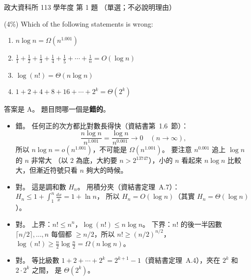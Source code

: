\begin{pastexam}[label={px:nccu-113-dsa-01}]{政大資科所 113 學年度 第 1 題}
（單選；不必說明理由）

(4\%) Which of the following statements is wrong:
\begin{enumerate}[label=\Alph*.]
\item $n\log n=\Omega(n^{1.001})$
\item $\frac{1}{1}+\frac{1}{2}+\frac{1}{3}+\frac{1}{4}+\frac{1}{5}+\cdots+\frac{1}{n}=O(\log n)$
\item $\log(n!)=\Theta(n\log n)$
\item $1+2+4+8+16+\cdots+2^k=\Theta(2^k)$
\end{enumerate}
\end{pastexam}

\begin{pastsoln}
答案是 A。 題目問哪一個是\textbf{錯的}。

\begin{itemize}
\item[A.] 錯。 任何正的次方都比對數長得快（資結書第~1.6~節）：
\[
\frac{n \log n}{n^{1.001}} = \frac{\log n}{n^{0.001}} \to 0 \quad (n \to \infty),
\]
所以 $n \log n = o(n^{1.001})$，不可能是 $\Omega(n^{1.001})$。 要注意 $n^{0.001}$ 追上 $\log n$ 的 $n$ 非常大
（以 $2$ 為底，大約要 $n > 2^{13747}$），小的 $n$ 看起來 $n \log n$ 比較大，但漸近符號只看 $n$ 夠大的時候。
\item[B.] 對。 這是調和數 $H_n$。 用積分夾（資結書定理~A.7）：$H_n \le 1 + \int_1^n \frac{dx}{x} = 1 + \ln n$，
所以 $H_n = O(\log n)$（其實 $H_n = \Theta(\log n)$）。
\item[C.] 對。 上界：$n! \le n^n$，$\log(n!) \le n \log n$。 下界：$n!$ 的後一半因數 $\lceil n/2\rceil, \ldots, n$
每個都 $\ge n/2$，所以 $n! \ge (n/2)^{n/2}$，$\log(n!) \ge \frac{n}{2}\log\frac{n}{2} = \Omega(n \log n)$。
\item[D.] 對。 等比級數 $1 + 2 + \cdots + 2^k = 2^{k+1} - 1$（資結書定理~A.4），夾在 $2^k$ 和 $2 \cdot 2^k$ 之間，
是 $\Theta(2^k)$。
\end{itemize}
\end{pastsoln}
